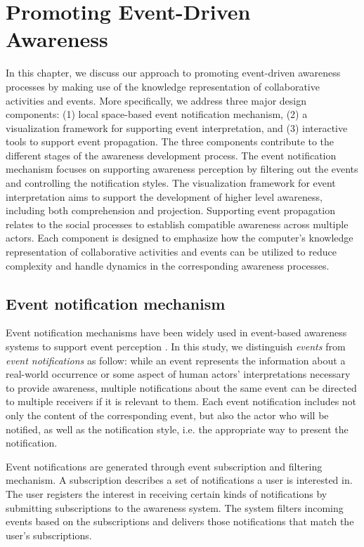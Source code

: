 \graphicspath{{Figures/}}

\chapter{Promoting Event-Driven Awareness} %
\label{cha:promoting_event_driven_awareness}
In this chapter, we discuss our approach to promoting event-driven awareness processes by making use of the knowledge representation of collaborative activities and events. More specifically, we address three major design components: (1) local space-based event notification mechanism, (2) a visualization framework for supporting event interpretation, and (3) interactive tools to support event propagation. The three components contribute to the different stages of the awareness development process. The event notification mechanism focuses on supporting awareness perception by filtering out the events and controlling the notification styles. The visualization framework for event interpretation aims to support the development of higher level awareness, including both comprehension and projection. Supporting event propagation relates to the social processes to establish compatible awareness across multiple actors. Each component is designed to emphasize how the computer's knowledge representation of collaborative activities and events can be utilized to reduce complexity and handle dynamics in the corresponding awareness processes.

\section{Event notification mechanism} %
\label{sec:event_notification_mechanism}
Event notification mechanisms have been widely used in event-based awareness systems to support event perception \cite{McCrickard2003}. In this study, we distinguish \emph{events} from \emph{event notifications} as follow: while an event represents the information about a real-world occurrence or some aspect of human actors' interpretations necessary to provide awareness, multiple notifications about the same event can be directed to multiple receivers if it is relevant to them. Each event notification includes not only the content of the corresponding event, but also the actor who will be notified, as well as the notification style, i.e. the appropriate way to present the notification.

Event notifications are generated through event subscription and filtering mechanism. A subscription describes a set of notifications a user is interested in. The user registers the interest in receiving certain kinds of notifications by submitting subscriptions to the awareness system. The system filters incoming events based on the subscriptions and delivers those notifications that match the user’s subscriptions. 

